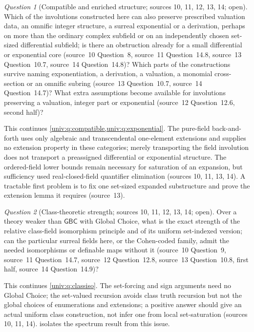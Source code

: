 \documentclass[11pt,letterpaper]{article}
\numberwithin{equation}{section}
\theoremstyle{definition}
\theoremstyle{remark}
\newtheorem{question}[question]{Question}
\newcommand{\GBC}{\mathsf{GBC}}
\begin{document}
\begin{question}[Compatible and enriched structure; sources 10, 11, 12, 13, 14; open]\label{univ:gs:q:enriched}
Which of the involutions constructed here can also preserve prescribed valuation data, an omnific
integer structure, a surreal exponential or a derivation, perhaps on more than the ordinary
complex subfield or on an independently chosen set-sized differential subfield; is there an
obstruction already for a small differential or exponential core (source~10 Question~8, source~11
Question~14.8, source~13 Question~10.7, source~14 Question~14.8)? Which parts of the
constructions survive naming exponentiation, a derivation, a valuation, a monomial cross-section
or an omnific subring (source~13 Question~10.7, source~14 Question~14.7)? What extra assumptions
become available for involutions preserving a valuation, integer part or exponential (source~12
Question~12.6, second half)?
\end{question}
This continues \cref{univ:q:compatible,univ:q:exponential}. The pure-field back-and-forth uses
only algebraic and transcendental one-element extensions and supplies no extension property in
these categories; merely transporting the field involution does not transport a preassigned
differential or exponential structure. The ordered-field lower bounds remain necessary for
saturation of an expansion, but sufficiency used real-closed-field quantifier elimination
(sources 10, 11, 13, 14). A tractable first problem is to fix one set-sized expanded
substructure and prove the extension lemma it requires (source~13).

\begin{question}[Class-theoretic strength; sources 10, 11, 12, 13, 14; open]\label{univ:gs:q:classstrength}
Over a theory weaker than $\GBC$ with Global Choice, what is the exact strength of the relative
class-field isomorphism principle and of its uniform set-indexed version; can the particular
surreal fields here, or the Cohen-coded family, admit the needed isomorphisms or definable maps
without it (source~10 Question~9, source~11 Question~14.7, source~12 Question~12.8, source~13
Question~10.8, first half, source~14 Question~14.9)?
\end{question}
This continues \cref{univ:q:classiso}. The set-forcing and sign arguments need no Global Choice;
the set-valued recursion avoids class truth recursion but not the global choices of enumerations
and extensions; a positive answer should give an actual uniform class construction, not infer one
from local set-saturation (sources 10, 11, 14).  isolates the spectrum
result from this issue.
\end{document}
